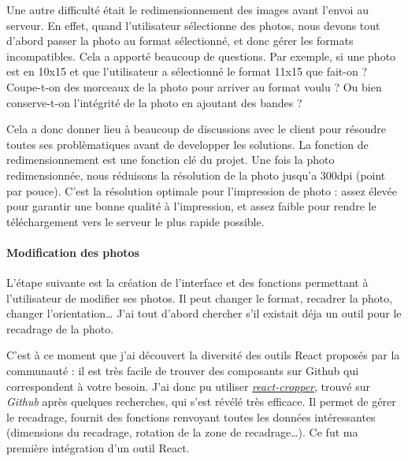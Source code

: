 \documentclass[12pt,a4paper]{article}
\begin{document}
  \bigskip

  Une autre difficulté était le redimensionnement des images avant l'envoi
  au serveur. En effet, quand l'utilisateur sélectionne des photos, nous
  devons tout d'abord passer la photo au format sélectionné, et donc gérer
  les formats incompatibles. Cela a apporté beaucoup de questions. Par
  exemple, si une photo est en 10x15 et que l'utilisateur a sélectionné le
  format 11x15 que fait-on ? Coupe-t-on des morceaux de la photo pour
  arriver au format voulu ? Ou bien conserve-t-on l'intégrité de la photo
  en ajoutant des bandes ?

  \bigskip

  Cela a donc donner lieu à beaucoup de discussions avec le client pour
  résoudre toutes ses problèmatiques avant de developper les solutions. La
  fonction de redimensionnement est une fonction clé du projet. Une fois
  la photo redimensionnée, nous réduisons la résolution de la photo
  jusqu'a 300dpi (point par pouce). C'est la résolution optimale pour
  l'impression de photo : assez élevée pour garantir une bonne qualité à
  l'impression, et assez faible pour rendre le téléchargement vers le
  serveur le plus rapide possible.

  \bigskip

  \paragraph{Modification des photos}\label{modification-des-photos}

  \bigskip

  L'étape suivante est la création de l'interface et des fonctions
  permettant à l'utilisateur de modifier ses photos. Il peut changer le
  format, recadrer la photo, changer l'orientation\ldots{} J'ai tout
  d'abord chercher s'il existait déja un outil pour le recadrage de la
  photo.

  \bigskip

  C'est à ce moment que j'ai découvert la diversité des outils React
  proposés par la communauté : il est très facile de trouver des
  composants sur Github qui correspondent à votre besoin. J'ai donc pu
  utiliser
  \href{https://github.com/roadmanfong/react-cropper}{\emph{react-cropper}},
  trouvé sur \emph{Github} après quelques recherches, qui s'est révélé
  très efficace. Il permet de gérer le recadrage, fournit des fonctions
  renvoyant toutes les données intéressantes (dimensions du recadrage,
  rotation de la zone de recadrage\ldots{}). Ce fut ma première
  intégration d'un outil React.
\end{document}
